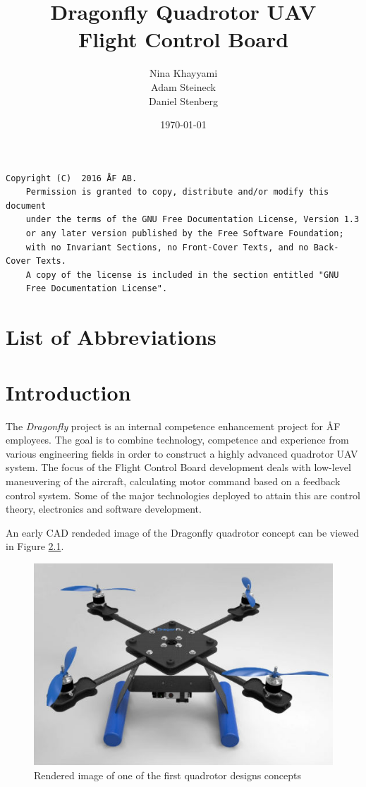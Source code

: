 \documentclass[a4paper]{report}
\title{Dragonfly Quadrotor UAV \\ Flight Control Board}
\author{Nina Khayyami \\ Adam Steineck \\ Daniel Stenberg }
\date{\today}         			%
\begin{document}

\maketitle                      		%
\begin{verbatim}Copyright (C)  2016 ÅF AB.
    Permission is granted to copy, distribute and/or modify this document
    under the terms of the GNU Free Documentation License, Version 1.3
    or any later version published by the Free Software Foundation;
    with no Invariant Sections, no Front-Cover Texts, and no Back-Cover Texts.
    A copy of the license is included in the section entitled "GNU
    Free Documentation License".
\end{verbatim}
\newpage
\tableofcontents				%

\newpage

\chapter{List of Abbreviations}

\chapter{Introduction}

The \emph{Dragonfly} project is an internal competence enhancement project for ÅF employees. The goal is to combine technology, competence and experience from various engineering fields in order to construct a highly advanced quadrotor UAV system. The focus of the Flight Control Board development deals with low-level maneuvering of the aircraft, calculating motor command based on a feedback control system. Some of the major technologies deployed to attain this are control theory, electronics and software development.

An early CAD rendeded image of the Dragonfly quadrotor concept can be viewed in Figure \ref{fig:quadrendered1}.

\begin{figure}[h]
    \centering
    \includegraphics[scale=0.4]{images/quad_concept1_rendered.jpg}
    \caption{Rendered image of one of the first quadrotor designs concepts}
    \label{fig:quadrendered1}
\end{figure}
\end{document}
